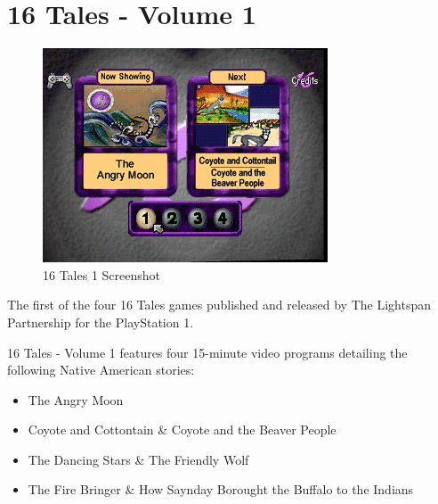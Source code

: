 \chapter{16 Tales - Volume 1}

\begin{figure}[H]
    \centering
    \includegraphics[width=\textwidth/2]{"./Games/16Tales/Images/16Tales1Screenshot.png"}
    \caption{16 Tales 1 Screenshot}
\end{figure}

The first of the four 16 Tales games published and released by The Lightspan Partnership for the PlayStation 1.

16 Tales - Volume 1 features four 15-minute video programs detailing the following Native American stories:

\begin{itemize}
    \item The Angry Moon
    \item Coyote and Cottontain \& Coyote and the Beaver People
    \item The Dancing Stars \& The Friendly Wolf
    \item The Fire Bringer \& How Saynday Borought the Buffalo to the Indians
\end{itemize}

